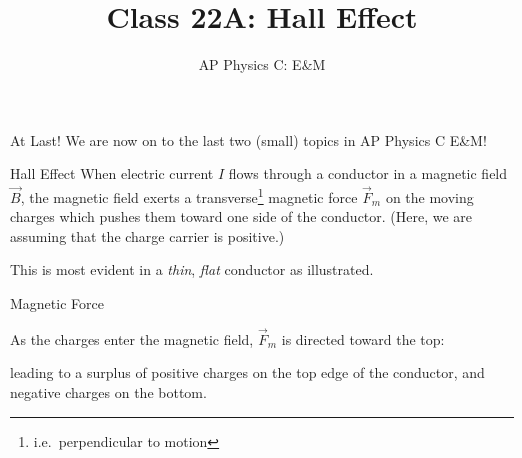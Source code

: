 \documentclass[12pt,aspectratio=169]{beamer}
\title{Class 22A: Hall Effect}
\subtitle{AP Physics C: E\&M}
\begin{document}
\begin{frame}
  \maketitle
\end{frame}

\begin{frame}{At Last!}
  \centering
  We are now on to the last two (small) topics in AP Physics C E\&M!
\end{frame}


\begin{frame}{Hall Effect}
  When electric current $I$ flows through a conductor in a magnetic field
  $\vec B$, the magnetic field exerts a transverse\footnote{i.e.\ perpendicular
  to motion} magnetic force $\vec F_m$ on the moving charges which pushes them
  toward one side of the conductor. (Here, we are assuming that the charge
  carrier is positive.)
  
  
  
  This is most evident in a \emph{thin}, \emph{flat} conductor as illustrated.
  \vspace{.2in}
\end{frame}



\begin{frame}{Magnetic Force}
  
  \vspace{-.1in}As the charges enter the magnetic field, $\vec F_m$ is directed
  toward the top:
  

  leading to a surplus of positive charges on the top edge of
  the conductor, and negative charges on the bottom.
\end{frame}
\end{document}
